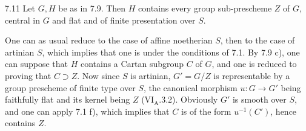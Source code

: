 \begin{corollary}{7.11}\label{XII.7.11}
Let $G,H$ be as in 7.9. Then $H$ contains every group sub-prescheme $Z$ of $G$, central in $G$ and flat and of finite presentation over $S$.
\end{corollary}
One can as usual reduce to the case of affine noetherian $S$, then to the case of artinian $S$, which implies that one is under the conditions of 7.1. By 7.9 c), one can suppose that $H$ contains a Cartan subgroup $C$ of $G$, and one is reduced to proving that $C\supset Z$. Now since $S$ is artinian, $G'=G/Z$ is representable by a group prescheme of finite type over $S$, the canonical morphism $u:G\to G'$ being faithfully flat and its kernel being $Z$ (VI$_{\mathrm A}$.3.2). Obviously $G'$ is smooth over $S$, and one can apply 7.1 f), which implies that $C$ is of the form $u^{-1}(C')$, hence contains $Z$.
